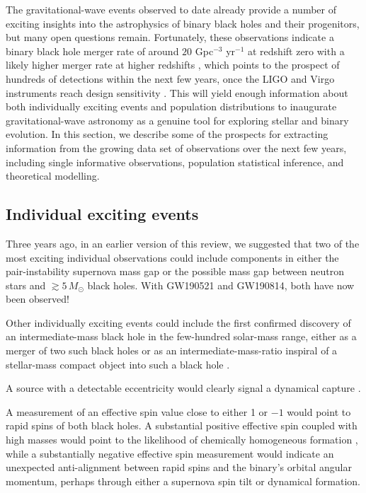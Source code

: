 \documentclass[review]{elsarticle}
\begin{document}
The gravitational-wave events observed to date already provide a number of exciting insights into the astrophysics of binary black holes and their progenitors, but many open questions remain.  Fortunately, these observations indicate a binary black hole merger rate of around $20$ Gpc$^{-3}$ yr$^{-1}$ at redshift zero with a likely higher merger rate at higher redshifts \citep{GWTC3:pop}, which points to the prospect of hundreds of detections within the next few years, once the LIGO and Virgo instruments reach design sensitivity \citep{scenarios}.  This will yield enough information about both individually exciting events and population distributions to inaugurate gravitational-wave astronomy as a genuine tool for exploring stellar and binary evolution.  In this section, we describe some of the prospects for extracting information from the growing data set of observations over the next few years, including single informative observations, population statistical inference, and theoretical modelling.

\subsection{Individual exciting events}
Three years ago, in an earlier version of this review, we suggested that two of the most exciting individual observations could include components in either the pair-instability supernova mass gap or the possible mass gap between neutron stars and $\gtrsim 5\, M_\odot$ black holes.  With GW190521 and GW190814, both have now been observed!

Other individually exciting events could include the first confirmed discovery of an intermediate-mass black hole in the few-hundred solar-mass range, either as a merger of two such black holes \citep[e.g.,][]{AmaroSeoaneSantamaria:2009,Veitch:2015,Graff:2015} or as an intermediate-mass-ratio inspiral of a stellar-mass compact object into such a black hole \citep[e.g.,][]{Mandel:2008,Haster:2015IMRI,Haster:2016}. 

A source with a detectable eccentricity would clearly signal a dynamical capture \citep{Breivik:2016}. 

A measurement of an effective spin value close to either 1 or $-1$ would point to rapid spins of both black holes. A substantial positive effective spin coupled with high masses would point to the likelihood of chemically homogeneous formation \citep{Marchant:2016}, while a substantially negative effective spin measurement would indicate an unexpected anti-alignment between rapid spins and the binary's orbital angular momentum, perhaps through either a supernova spin tilt or dynamical formation.  
\end{document}
